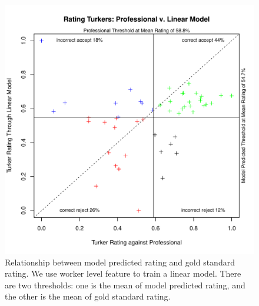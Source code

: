\documentclass[11pt]{article}
\begin{document}
\begin{figure}[htbp]
  \centering
  \includegraphics[width=\linewidth]{Workerfeature/rrankingworkerfeaturelm2.pdf}
  \caption{Relationship between model predicted rating and gold standard rating. We use worker level feature to train a linear model. There are two thresholds: one is the mean of model predicted rating, and the other is the mean of gold standard rating.}
    \label{flmworkerrrating2}
\end{figure}
\end{document}
